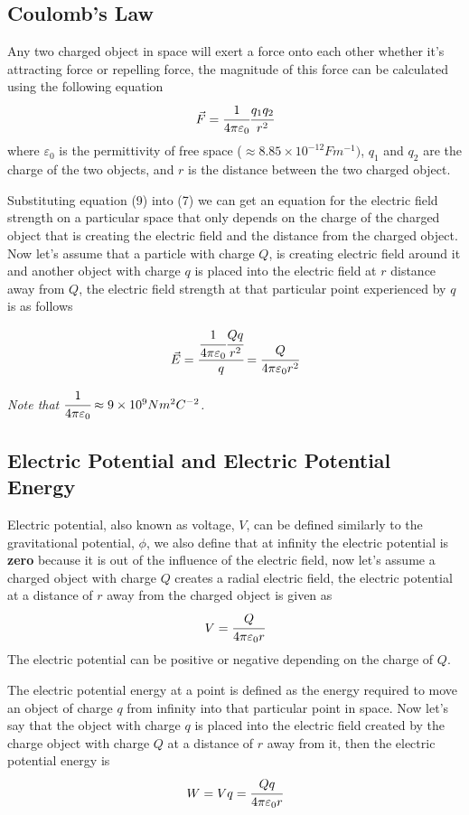 \documentclass{article}
\begin{document}
 \subsection{Coulomb's Law}


Any two charged object in space will exert a force onto each other whether it's attracting force or repelling force, the magnitude of this force can be calculated using the following equation
\begin{equation}
\vec{F}=\cfrac{1}{4\pi\varepsilon_0}\cfrac{q_1 q_2}{r^2}
\end{equation}
where $\varepsilon_0$ is the permittivity of free space ($\approx8.85 \times 10^{-12}Fm^{-1})$, $q_1$ and $q_2$ are the charge of the two objects, and $r$ is the distance between the two charged object.

Substituting equation (9) into (7) we can get an equation for the electric field strength on a particular space that only depends on the charge of the charged object that is creating the electric field and the distance from the charged object. Now let's assume that a particle with charge $Q$, is creating electric field around it and another object with charge $q$ is placed into the electric field at $r$ distance away from $Q$, the electric field strength at that particular point experienced by $q$ is as follows

$$\vec{E}=\cfrac{\cfrac{1}{4\pi\varepsilon_0}\cfrac{Qq}{r^2}}{q}=\cfrac{Q}{4\pi\varepsilon_0r^2}$$

\textit{Note that $\cfrac{1}{4\pi\varepsilon_0}\approx 9\times 10^9 Nm^2C^{-2}$.}


 \subsection{Electric Potential and Electric Potential Energy}

Electric potential, also known as voltage, $V$, can be defined similarly to the gravitational potential, $\phi$, we also define that at infinity the electric potential is \textbf{zero} because it is out of the influence of the electric field, now let's assume a charged object with charge $Q$ creates a radial electric field, the electric potential at a distance of $r$ away from the charged object is given as 
$$V=\cfrac{Q}{4\pi\varepsilon_0r}$$
The electric potential can be positive or negative depending on the charge of $Q$. 

The electric potential energy at a point is defined as the energy required to move an object of charge $q$ from infinity into that particular point in space. Now let's say that the object with charge $q$ is placed into the electric field created by the charge object with charge $Q$ at a distance of $r$ away from it, then the electric potential energy is 
$$W=Vq=\cfrac{Qq}{4\pi\varepsilon_0r}$$
\end{document}

